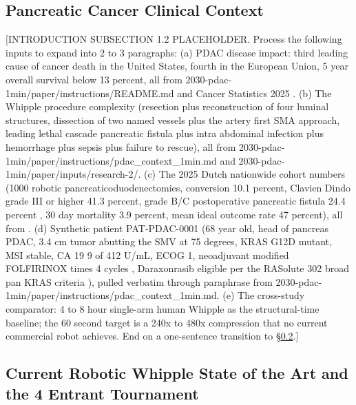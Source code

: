 \subsection{Pancreatic Cancer Clinical Context}
\label{sec:intro-pdac}

[INTRODUCTION SUBSECTION 1.2 PLACEHOLDER. Process the following inputs to expand into 2 to 3 paragraphs:
(a) PDAC disease impact: third leading cause of cancer death in the United States, fourth in the European Union, 5 year overall survival below 13 percent, all from 2030-pdac-1min/paper/instructions/README.md and Cancer Statistics 2025 \cite{Siegel2025CancerStatistics}.
(b) The Whipple procedure complexity (resection plus reconstruction of four luminal structures, dissection of two named vessels plus the artery first SMA approach, leading lethal cascade pancreatic fistula plus intra abdominal infection plus hemorrhage plus sepsis plus failure to rescue), all from 2030-pdac-1min/paper/instructions/pdac_context_1min.md and 2030-pdac-1min/paper/inputs/research-2/.
(c) The 2025 Dutch nationwide cohort numbers (1000 robotic pancreaticoduodenectomies, conversion 10.1 percent, Clavien Dindo grade III or higher 41.3 percent, grade B/C postoperative pancreatic fistula 24.4 percent \cite{Bassi2017ISGPSPostOpFistula}, 30 day mortality 3.9 percent, mean ideal outcome rate 47 percent), all from \cite{DutchCohort2025Whipple}.
(d) Synthetic patient PAT-PDAC-0001 (68 year old, head of pancreas PDAC, 3.4 cm tumor abutting the SMV at 75 degrees, KRAS G12D mutant, MSI stable, CA 19 9 of 412 U/mL, ECOG 1, neoadjuvant modified FOLFIRINOX times 4 cycles \cite{Conroy2018FOLFIRINOXAdjuvant}, Daraxonrasib eligible per the RASolute 302 broad pan KRAS criteria \cite{rasolute302}), pulled verbatim through paraphrase from 2030-pdac-1min/paper/instructions/pdac_context_1min.md.
(e) The cross-study comparator: 4 to 8 hour single-arm human Whipple as the structural-time baseline; the 60 second target is a 240x to 480x compression that no current commercial robot achieves.
End on a one-sentence transition to \S \ref{sec:intro-baseline}.]

\subsection{Current Robotic Whipple State of the Art and the 4 Entrant Tournament}
\label{sec:intro-baseline}

